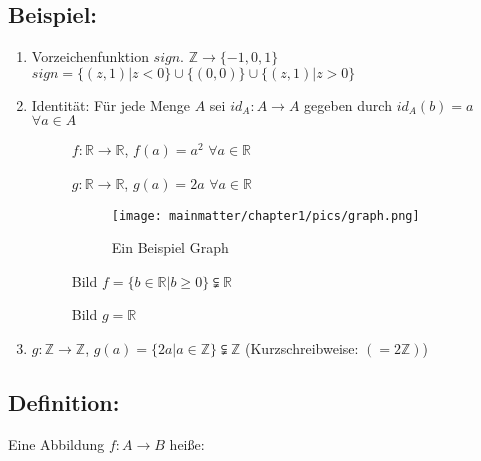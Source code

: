 \subsection{Beispiel:}
	\begin{enumerate} 

		\item Vorzeichenfunktion $sign.$ $\mathbb{Z} \rightarrow\{-1,0,1\}$ $sign= \{(z,1)|z < 0\} \cup \{(0,0)\} \cup \{(z,1)|z > 0\}$

		\item  Identität: Für jede Menge $A$ sei $id_{A}: A \rightarrow A$ gegeben durch $id_{A} (b)=a$ $ \forall a \in A$

		\begin{description}
			\item[ ]{\pgreen $f:\mathbb{R}\rightarrow \mathbb{R}$, $f(a) = a^{2}$ $\forall a \in \mathbb{R}$}
			\item[ ]{\pblue $g:\mathbb{R}\rightarrow \mathbb{R}$, $g(a)=2a$ $\forall a\in \mathbb{R}$}
				\begin{figure} [H]
				\centering 
				\texttt{[image: mainmatter/chapter1/pics/graph.png]}
				\caption{Ein Beispiel Graph} 
				\end{figure}
			\item[ ] Bild $f=\{b \in \mathbb{R} | b \geq 0\} \subsetneqq \mathbb{R}$
			\item[ ] Bild $g = \mathbb{R}$
		\end{description}
		
		\item $g:\mathbb{Z}\rightarrow\mathbb{Z}$, $g(a)=\{2a|a\in\mathbb{Z}\} \subsetneqq \mathbb{Z}$ (Kurzschreibweise: $(=2\mathbb{Z})$)

	\end{enumerate} 
%
%
%
\subsection{Definition:}
Eine Abbildung $f: A \rightarrow B$ heiße:


